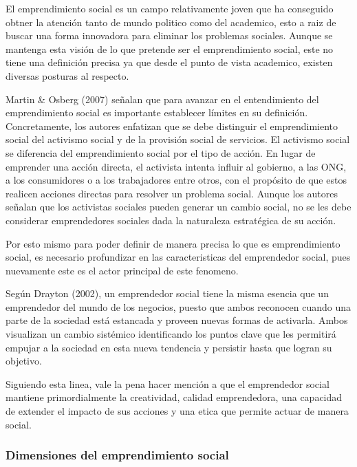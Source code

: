\documentclass[11pt]{article}
\begin{document}
El emprendimiento social es un campo relativamente joven que ha conseguido obtner la atención tanto de mundo politico como del academico, esto a raiz de buscar una forma innovadora para eliminar los problemas sociales. Aunque se mantenga esta visión de lo que pretende ser el emprendimiento social, este no tiene una definición precisa ya que desde el punto de vista academico, existen diversas posturas al respecto.

Martin  \&  Osberg  (2007)  señalan  que  para  avanzar  en  el  entendimiento  del  emprendimiento social es importante establecer límites en su definición. Concretamente, los autores enfatizan que se debe distinguir el emprendimiento social del activismo social y de la provisión social de servicios. El activismo social se diferencia del emprendimiento social por el tipo de acción. En lugar de emprender una acción directa, el activista intenta influir al gobierno, a las ONG, a los consumidores o a los trabajadores entre otros, con el propósito de que estos realicen acciones directas para resolver un problema social. Aunque los autores señalan que los activistas sociales pueden generar un cambio social, no se les debe considerar emprendedores sociales dada la naturaleza estratégica de su acción.

Por esto mismo para poder definir de manera precisa lo que es emprendimiento social, es necesario profundizar en las caracteristicas del emprendedor social, pues nuevamente este es el actor principal de este fenomeno.

Según Drayton (2002), un emprendedor social tiene la misma esencia que un  emprendedor  del  mundo  de  los  negocios,  puesto  que  ambos  reconocen  cuando  una  parte  de  la  sociedad  está  estancada  y  proveen  nuevas  formas  de  activarla.  Ambos  visualizan un cambio sistémico identificando los puntos clave que les permitirá empujar a  la  sociedad  en  esta  nueva  tendencia  y  persistir  hasta  que  logran  su  objetivo. 

Siguiendo esta linea, vale la pena hacer mención a que el emprendedor social mantiene primordialmente la creatividad, calidad emprendedora, una capacidad de extender el impacto de sus acciones y una etica que permite actuar de manera social. 

\subsubsection{Dimensiones del emprendimiento social}
\label{sec:org4802581}
\end{document}
